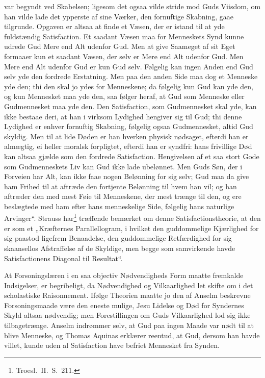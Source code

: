\documentclass[12pt]{book}
\begin{document}
var begyndt ved Skabelsen; ligesom det ogsaa vilde stride mod Guds
Viisdom, om han vilde lade det ypperste af sine Værker, den
fornuftige Skabning, gaae tilgrunde. Opgaven er altsaa at finde et
Væsen, der er istand til at yde fuldstændig Satisfaction. Et saadant
Væsen maa for Menneskets Synd kunne udrede Gud Mere end Alt udenfor
Gud. Men at give Saameget af sit Eget formaaer kun et saadant Væsen,
der selv er Mere end Alt udenfor Gud. Men Mere end Alt udenfor Gud
er kun Gud selv. Følgelig kan ingen Anden end Gud selv yde den
fordrede Erstatning. Men paa den anden Side maa dog et Menneske yde
den; thi den skal jo ydes for Menneskene; da følgelig kun Gud kan
yde den, og kun Mennesket maa yde den, saa følger heraf, at Gud som
Menneske eller Gudmennesket maa yde den. Den Satisfaction, som
Gudmennesket skal yde, kan ikke bestaae deri, at han i virksom
Lydighed hengiver sig til Gud; thi denne Lydighed er enhver
fornuftig Skabning, følgelig ogsaa Gudmennesket, altid Gud skyldig.
Men til at lide Døden er han hverken physisk nødsaget, efterdi han
er almægtig, ei heller moralsk forpligtet, efterdi han er syndfri:
hans frivillige Død kan altsaa gjælde som den fordrede Satisfaction.
Hengivelsen af et saa stort Gode som Gudmenneskets Liv kan Gud ikke
lade ubelønnet. Men Guds Søn, der i Forveien har Alt, kan ikke faae
nogen Belønning for sig selv; Gud maa da give ham Frihed til at
aftræde den fortjente Belønning til hvem han vil; og han aftræder
den med mest Føie til Menneskene, der mest trænge til den, og ere
beslægtede med ham efter hans
menneskelige Side, følgelig hans naturlige Arvinger“. Strauss
har\footnote{Troesl.\ II.\ S.\ 211.} træffende bemærket om denne
Satisfactionstheorie, at den er som et „Kræfternes Parallellogram, i
hvilket den guddommelige Kjærlighed for sig paastod ligefrem
Benaadelse, den guddommelige Retfærdighed for sig skaansellos
Afstraffelse af de Skyldige, men begge som samvirkende havde
Satisfactionens Diagonal til Resultat“.

At Forsoningslæren i en saa objectiv Nødvendigheds Form maatte
fremkalde Indsigelser, er begribeligt, da Nødvendighed og
Vilkaarlighed let skifte om i det scholastiske Raisonnement. Ifølge
Theorien maatte jo den af Anselm beskrevne Forsoningsmaade være den
eneste mulige, Jesu Lidelse og Død for Syndernes Skyld altsaa
nødvendig; men Forestillingen om Guds Vilkaarlighed lod sig ikke
tilbagetrænge. Anselm indrømmer selv, at Gud paa ingen Maade var
nødt til at blive Menneske, og Thomas Aquinas erklærer reentud, at
Gud, dersom han havde villet, kunde uden al Satisfaction have
befriet Mennesket fra Synden.
\end{document}
